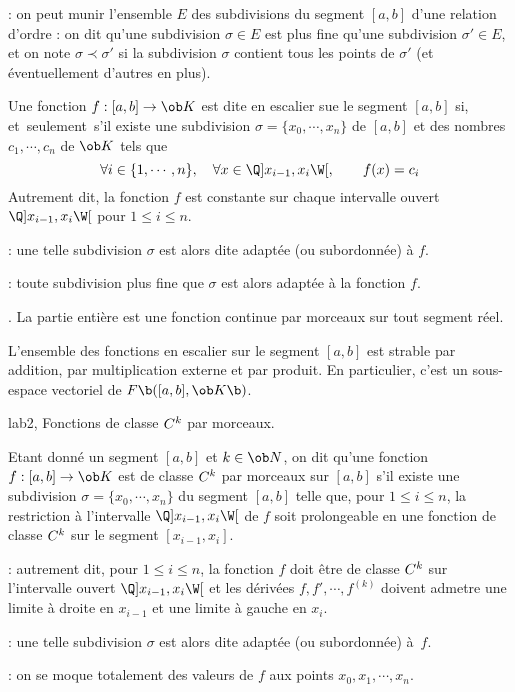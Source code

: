 \Remarque : on peut munir l'ensemble $E$ des subdivisions du segment $[a,b]$ d'une relation d'ordre : on dit qu'une subdivision $\sigma\in E$ est plus fine qu'une subdivision $\sigma'\in E$, et on note $\sigma\prec\sigma'$ si la subdivision $\sigma$ contient tous les points de $\sigma'$ (et éventuellement d'autres en plus). 
\bigskip

\Definition []  Une fonction $f:[a,b]\to\ob K$ est dite en escalier sue le segment $[a,b]$ si, et~seulement~s'il existe une subdivision $\sigma=\{x_0,\cdots,x_n\}$ de $[a,b]$ et des nombres $c_1,\cdots,c_n$ de $\ob K$ tels que 
$$
\forall i\in\{1,\cdots, n\}, \quad \forall x\in\Q]x_{i-1},x_i\W[,\qquad f(x)=c_i
$$ 
Autrement dit, la fonction $f$ est constante sur chaque intervalle ouvert $\Q]x_{i-1},x_i\W[$ pour $1\le i\le n$. 
\bigskip

\Remarque : une telle subdivision $\sigma$ est alors dite adaptée (ou subordonnée) à $f$. 
\bigskip

\Remarque  : toute subdivision plus fine que $\sigma$ est alors adaptée à la fonction $f$. 
\bigskip

\Exemple.  La partie entière est une fonction continue par morceaux sur tout segment réel. 
\bigskip

\Propriete []  L'ensemble des fonctions en escalier sur le segment $[a,b]$ est strable par addition, par multiplication externe et par produit. En particulier, c'est un sous-espace vectoriel de $\sc F\b([a,b],\ob K\b)$. 
\bigskip

\Subsection lab2, Fonctions de classe $\sc C^k$ par morceaux. 

\Definition []  Etant donné un segment $[a,b]$ et $k\in\ob N$, on dit qu'une fonction $f:[a,b]\to\ob K$ est 
de classe $\sc C^k$ par morceaux sur $[a,b]$ s'il existe une subdivision $\sigma=\{x_0,\cdots,x_n\}$ du segment $[a,b]$ telle que, pour $1\le i\le n$, la restriction à l'intervalle $\Q]x_{i-1},x_i\W[$ de $f$ soit prolongeable en une fonction de classe $\sc C^k$ sur le segment $[x_{i-1},x_i]$. 
\bigskip

\Remarque : autrement dit, pour $1\le i\le n$, la fonction $f$ doit être de classe $\sc C^k$ sur l'intervalle ouvert $\Q]x_{i-1},x_i\W[$ et les dérivées $f, f',\cdots, f^{(k)}$ doivent admetre une limite à droite en $x_{i-1}$ et une limite à gauche en $x_i$. 
\bigskip

\Remarque : une telle subdivision $\sigma$ est alors dite adaptée (ou subordonnée) à~$f$. 
\bigskip

\Remarque : on se moque totalement des valeurs de $f$ aux points $x_0, x_1, \cdots, x_n$. 
\bigskip


